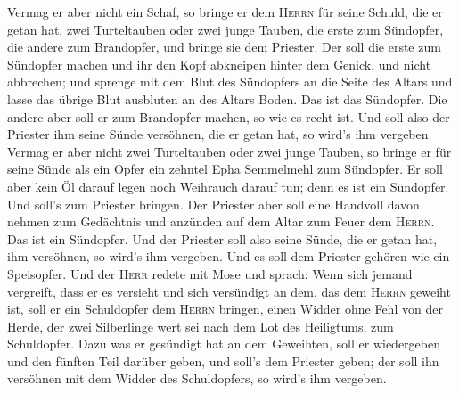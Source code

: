  Vermag er aber nicht ein Schaf, so bringe er dem
\textsc{Herrn} für seine Schuld, die er getan hat, zwei Turteltauben
oder zwei junge Tauben, die erste zum Sündopfer, die andere zum
Brandopfer,  und bringe sie dem Priester. Der soll die
erste zum Sündopfer machen und ihr den Kopf abkneipen hinter dem Genick,
und nicht abbrechen;  und sprenge mit dem Blut des
Sündopfers an die Seite des Altars und lasse das übrige Blut ausbluten
an des Altars Boden. Das ist das Sündopfer.  Die andere
aber soll er zum Brandopfer machen, so wie es recht ist. Und soll also
der Priester ihm seine Sünde versöhnen, die er getan hat, so wird's ihm
vergeben.  Vermag er aber nicht zwei Turteltauben oder
zwei junge Tauben, so bringe er für seine Sünde als ein Opfer ein
zehntel Epha Semmelmehl zum Sündopfer. Er soll aber kein Öl darauf legen
noch Weihrauch darauf tun; denn es ist ein Sündopfer. 
Und soll's zum Priester bringen. Der Priester aber soll eine Handvoll
davon nehmen zum Gedächtnis und anzünden auf dem Altar zum Feuer dem
\textsc{Herrn}. Das ist ein Sündopfer.  Und der Priester
soll also seine Sünde, die er getan hat, ihm versöhnen, so wird's ihm
vergeben. Und es soll dem Priester gehören wie ein Speisopfer.
 Und der \textsc{Herr} redete mit Mose und sprach:
 Wenn sich jemand vergreift, dass er es versieht und sich
versündigt an dem, das dem \textsc{Herrn} geweiht ist, soll er ein
Schuldopfer dem \textsc{Herrn} bringen, einen Widder ohne Fehl von der
Herde, der zwei Silberlinge wert sei nach dem Lot des Heiligtums, zum
Schuldopfer.  Dazu was er gesündigt hat an dem Geweihten,
soll er wiedergeben und den fünften Teil darüber geben, und soll's dem
Priester geben; der soll ihn versöhnen mit dem Widder des Schuldopfers,
so wird's ihm vergeben.

